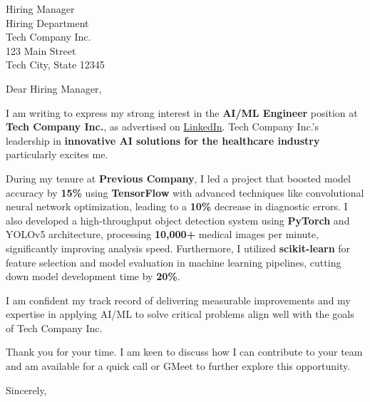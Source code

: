 \documentclass{letter}
\date{\today}
\begin{document}
\begin{letter}{Hiring Manager\\
Hiring Department\\
Tech Company Inc.\\
123 Main Street\\
Tech City, State 12345}

\opening{Dear Hiring Manager,}

I am writing to express my strong interest in the \textbf{AI/ML Engineer} position at \textbf{Tech Company Inc.}, as advertised on \href{URL-to-job-posting}{LinkedIn}. Tech Company Inc.'s leadership in \textbf{innovative AI solutions for the healthcare industry} particularly excites me.

During my tenure at \textbf{Previous Company}, I led a project that boosted model accuracy by \textbf{15\%} using \textbf{TensorFlow} with advanced techniques like convolutional neural network optimization, leading to a \textbf{10\%} decrease in diagnostic errors. I also developed a high-throughput object detection system using \textbf{PyTorch} and YOLOv5 architecture, processing \textbf{10,000+} medical images per minute, significantly improving analysis speed. Furthermore, I utilized \textbf{scikit-learn} for feature selection and model evaluation in machine learning pipelines, cutting down model development time by \textbf{20\%}.

I am confident my track record of delivering measurable improvements and my expertise in applying AI/ML to solve critical problems align well with the goals of Tech Company Inc.

Thank you for your time. I am keen to discuss how I can contribute to your team and am available for a quick call or GMeet to further explore this opportunity.

\closing{Sincerely,}

\signature{Your Name}

\end{letter}
\end{document}

